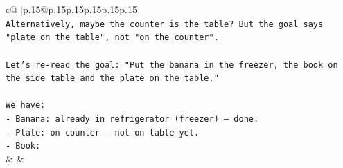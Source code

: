 \documentclass{article}
\begin{document}
{\begin{supertabular}{c@{$\;$}|p{.15\linewidth}@{}p{.15\linewidth}p{.15\linewidth}p{.15\linewidth}p{.15\linewidth}p{.15\linewidth}}
{{{\\ 
\texttt{Alternatively, maybe the counter is the table? But the goal says "plate on the table", not "on the counter".} \\
\\ 
\texttt{Let's re{-}read the goal: "Put the banana in the freezer, the book on the side table and the plate on the table."} \\
\\ 
\texttt{We have:} \\
\texttt{{-} Banana: already in refrigerator (freezer) — done.} \\
\texttt{{-} Plate: on counter — not on table yet.} \\
\texttt{{-} Book:} \\
            }
        }
    }
    & & \\ \\


\end{supertabular}}
\end{document}
